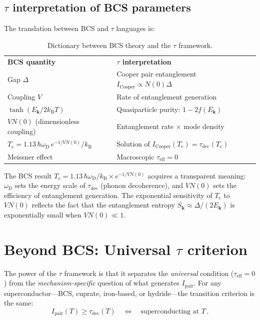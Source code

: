 \documentclass[prb,twocolumn,superscriptaddress,longbibliography,floatfix]{revtex4-2}
\newcommand{\kB}{k_{\mathrm{B}}}
\newcommand{\tauasym}{\tau}
\newcommand{\taueff}{\tauasym_{\mathrm{eff}}}
\newcommand{\taudec}{\tauasym_{\mathrm{dec}}}
\newcommand{\Icoop}{I_{\mathrm{Cooper}}}
\newcommand{\Ipair}{I_{\mathrm{pair}}}
\newcommand{\Tc}{T_{\mathrm{c}}}
\newcommand{\oD}{\omega_{\mathrm{D}}}
\newcommand{\Ek}{E_{\bm{k}}}
\begin{document}
\subsection{$\tauasym$ interpretation of BCS parameters}

The translation between BCS and $\tauasym$ languages is:

\begin{table}[h]
\caption{\label{tab:dictionary}Dictionary between BCS theory
and the $\tauasym$ framework.}
\begin{ruledtabular}
\begin{tabular}{ll}
\textbf{BCS quantity} & \textbf{$\tauasym$ interpretation} \\
\colrule
Gap $\Delta$ & Cooper pair entanglement $\Icoop \propto N(0)\Delta$ \\
Coupling $V$ & Rate of entanglement generation \\
$\tanh(\Ek/2\kB T)$ & Quasiparticle purity: $1 - 2f(\Ek)$ \\
$V N(0)$ (dimensionless coupling) & Entanglement rate $\times$ mode density \\
$\Tc = 1.13\,\hbar\oD\, e^{-1/VN(0)}/\kB$ & Solution of $\Icoop(\Tc) = \taudec(\Tc)$ \\
Meissner effect & Macroscopic $\taueff = 0$ \\
\end{tabular}
\end{ruledtabular}
\end{table}

The BCS result $\Tc = 1.13\,\hbar\oD/\kB \times e^{-1/VN(0)}$
acquires a transparent meaning: $\oD$ sets the energy scale of
$\taudec$ (phonon decoherence), and $VN(0)$ sets the efficiency
of entanglement generation.  The exponential sensitivity of $\Tc$
to $VN(0)$ reflects the fact that the entanglement entropy
$S_{\bm{k}} \approx \Delta/(2\Ek)$ is exponentially small when
$VN(0) \ll 1$.

\section{Beyond BCS: Universal $\tauasym$ criterion}
\label{sec:universal}

The power of the $\tauasym$ framework is that it separates the
\emph{universal} condition ($\taueff = 0$) from the
\emph{mechanism-specific} question of what generates $\Ipair$.
For any superconductor---BCS, cuprate, iron-based, or
hydride---the transition criterion is the same:
\begin{equation}\label{eq:universal}
  \boxed{\Ipair(T) \geq \taudec(T)}
  \quad\Leftrightarrow\quad
  \text{superconducting at } T\,.
\end{equation}
\end{document}
